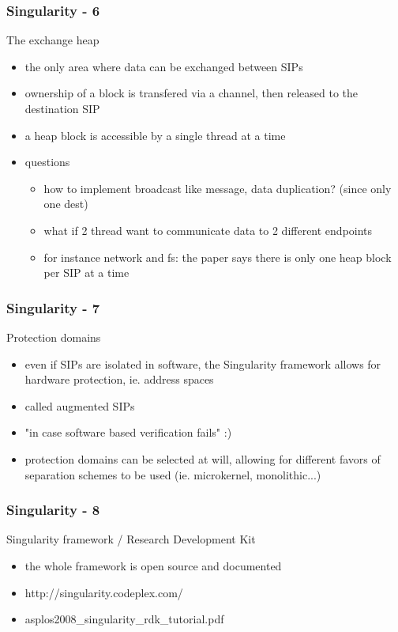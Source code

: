 \begin{frame}
  \frametitle{Singularity - 6}
  The exchange heap
 
 \begin{itemize}
   \item the only area where data can be exchanged between SIPs
   \item ownership of a block is transfered via a channel, then released to the destination SIP
   \item a heap block is accessible by a single thread at a time
   \item questions
     \begin{itemize}
       \item how to implement broadcast like message, data duplication? (since only one dest)
       \item what if 2 thread want to communicate data to 2 different endpoints
       \item for instance network and fs: the paper says there is only one heap block per SIP at a time
     \end{itemize}
 \end{itemize}
\end{frame}


\begin{frame}
  \frametitle{Singularity - 7}
  Protection domains
 
  \begin{itemize}
    \item even if SIPs are isolated in software, the Singularity framework allows for hardware protection, ie. address spaces
    \item called augmented SIPs
    \item "in case software based verification fails" :)
    \item protection domains can be selected at will, allowing for different favors of separation schemes to be used (ie. microkernel, monolithic...)
  \end{itemize}
\end{frame}


\begin{frame}
  \frametitle{Singularity - 8}
  Singularity framework / Research Development Kit
  \begin{itemize}
    \item the whole framework is open source and documented
    \item http://singularity.codeplex.com/
    \item asplos2008\_singularity\_rdk\_tutorial.pdf
  \end{itemize}
\end{frame}


